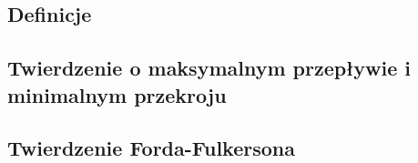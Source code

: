 \subsection{Definicje}
\label{flows}


\subsection{Twierdzenie o maksymalnym przepływie i minimalnym przekroju}


\subsection{Twierdzenie Forda-Fulkersona}
